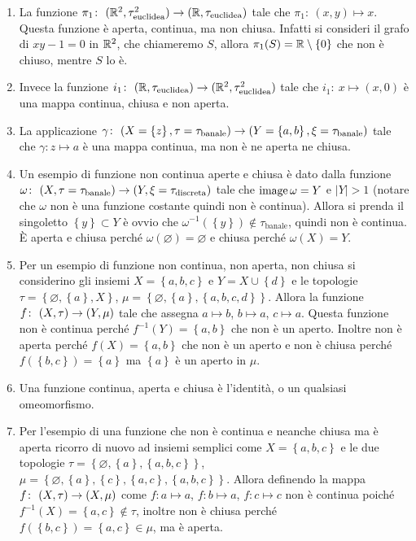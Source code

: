 \begin{example}
\begin{enumerate}
	\item La funzione $\pi_1 \colon\ (\mathbb{R}^2,\tau^2_{\text{euclidea}}) \rightarrow (\mathbb{R},\tau_{\text{euclidea}})$ tale che $\pi_1 \colon\ (x,y) \mapsto x$. Questa funzione è aperta, continua, ma non chiusa. Infatti si consideri il grafo di $xy - 1 = 0$ in $\mathbb{R}^2$, che chiameremo $S$, allora $\pi_1(S) = \mathbb{R} \setminus \left\{0\right\}$ che non è chiuso, mentre $S$ lo è.
	\item Invece la funzione $i_1 \colon\ (\mathbb{R},\tau_{\text{euclidea}}) \rightarrow (\mathbb{R}^2,\tau^2_{\text{euclidea}})$ tale che $i_1 \colon\ x \mapsto (x,0)$ è una mappa continua, chiusa e non aperta. 
	\item La applicazione $\gamma \colon\ (X = \left\{z\right\},\tau =\tau_{\text{banale}}) \rightarrow (Y = \left\{a,b\right\},\xi = \tau_{\text{banale}})$ tale che  $\gamma \colon z \mapsto a$ è una mappa continua, ma non è ne aperta ne chiusa.
	\item Un esempio di funzione non continua aperte e chiusa è dato dalla funzione $\omega \colon\ (X,\tau =\tau_{\text{banale}}) \rightarrow (Y,\xi = \tau_{\text{discreta}})$ tale che $\operatorname{image}{\omega} = Y$ e $|Y| > 1$ (notare che $\omega$ non è una funzione costante quindi non è continua). Allora si prenda il singoletto $\left\{y\right\} \subset Y$ è ovvio che $\omega^{-1}(\left\{y\right\}) \notin \tau_{\text{banale}}$, quindi non è continua. È aperta e chiusa perché $\omega(\varnothing) = \varnothing$ e chiusa perché $\omega(X) = Y$.
	\item Per un esempio di funzione non continua, non aperta, non chiusa si considerino gli insiemi $X = \left\{a,b,c\right\}$ e $Y = X \cup \left\{d\right\}$ e le topologie $\tau = \left\{\varnothing, \left\{a\right\}, X\right\}$, $\mu = \left\{ \varnothing, \left\{a\right\}, \left\{a,b,c,d\right\}\right\}$. Allora la funzione $f \colon\ (X,\tau) \rightarrow (Y,\mu)$ tale che assegna $a \mapsto b$, $b \mapsto a$, $c \mapsto a$. Questa funzione non è continua perché $f^{-1}(Y) = \left\{a,b\right\}$ che non è un aperto. Inoltre non è aperta perché $f(X) = \left\{a,b\right\}$ che non è un aperto e non è chiusa perché $f(\left\{b,c\right\}) = \left\{a\right\}$ ma $\left\{a\right\}$ è un aperto in $\mu$.
	\item Una funzione continua, aperta e chiusa è l'identità, o un qualsiasi omeomorfismo.
	\item Per l'esempio di una funzione che non è continua e neanche chiusa ma è aperta ricorro di nuovo ad insiemi semplici come $X = \left\{a,b,c\right\}$ e le due topologie $\tau = \left\{\varnothing, \left\{a\right\},\left\{a,b,c\right\}\right\}$, $\mu = \left\{\varnothing, \left\{a\right\}, \left\{c\right\}, \left\{a,c\right\}, \left\{a,b,c\right\}\right\}$. Allora definendo la mappa $f \colon\ (X,\tau) \rightarrow (X,\mu)$ come $f \colon a \mapsto a$, $f \colon b \mapsto a$, $f \colon c \mapsto c$ non è continua poiché $f^{-1}(X) = \left\{a,c\right\} \notin \tau$, inoltre non è chiusa perché $f(\left\{b,c\right\}) = \left\{a,c\right\} \in \mu$, ma è aperta.\\

\end{enumerate}
\end{example}
